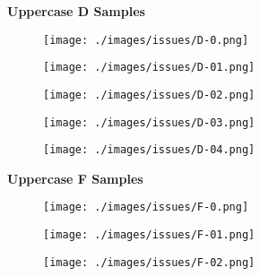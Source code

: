 \begin{figure}[H]
    \centering
    \textbf{Uppercase D Samples}\par\medskip 
    \begin{subfigure}{.10\textwidth}
        \centering
        \texttt{[image: ./images/issues/D-0.png]}
        \label{fig:issue_D0}
    \end{subfigure}%
    \begin{subfigure}{.10\textwidth}
        \centering
        \texttt{[image: ./images/issues/D-01.png]}
        \label{fig:issue_D01}
    \end{subfigure}%
    \begin{subfigure}{.10\textwidth}
        \centering
        \texttt{[image: ./images/issues/D-02.png]}
        \label{fig:issue_D02}
    \end{subfigure}%
    \begin{subfigure}{.10\textwidth}
        \centering
        \texttt{[image: ./images/issues/D-03.png]}
        \label{fig:issue_D03}
    \end{subfigure}%
    \begin{subfigure}{.10\textwidth}
        \centering
        \texttt{[image: ./images/issues/D-04.png]}
        \label{fig:issue_D04}
    \end{subfigure}\par\medskip
    \textbf{Uppercase F Samples}\par\medskip
    \begin{subfigure}{.10\textwidth}
        \centering
        \texttt{[image: ./images/issues/F-0.png]}
        \label{fig:issue_F0}
    \end{subfigure}%
    \begin{subfigure}{.10\textwidth}
        \centering
        \texttt{[image: ./images/issues/F-01.png]}
        \label{fig:issue_F01}
    \end{subfigure}%
    \begin{subfigure}{.10\textwidth}
        \centering
        \texttt{[image: ./images/issues/F-02.png]}

\end{subfigure}
\end{figure}
